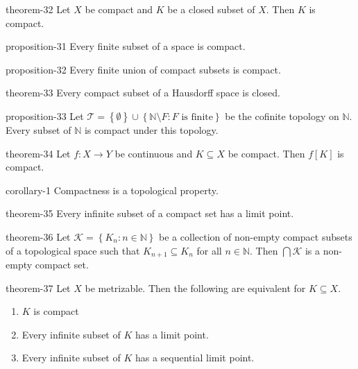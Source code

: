 \documentclass[10pt,]{article}
\newcommand{\mb}{\mathbb}
\newcommand{\mc}{\mathcal}
\newcommand{\setBuilder}[2]{\left\{#1:#2\right\}}
\newcommand{\setList}[1]{\left\{#1\right\}}
\begin{document}
\begin{theorem}{}{}{theorem-32}%
\hypertarget{p-144}{}%
Let \(X\) be compact and \(K\) be a closed subset of \(X\). Then \(K\) is compact.%
\end{theorem}
\begin{proposition}{}{}{proposition-31}%
\hypertarget{p-145}{}%
Every finite subset of a space is compact.%
\end{proposition}
\begin{proposition}{}{}{proposition-32}%
\hypertarget{p-146}{}%
Every finite union of compact subsets is compact.%
\end{proposition}
\begin{theorem}{}{}{theorem-33}%
\hypertarget{p-147}{}%
Every compact subset of a Hausdorff space is closed.%
\end{theorem}
\begin{proposition}{}{}{proposition-33}%
\hypertarget{p-148}{}%
Let \(\mc T=\setList{\emptyset}\cup
\setBuilder{\mb N\setminus F}{F\text{ is finite}}\) be the cofinite topology on \(\mb N\). Every subset of \(\mb N\) is compact under this topology.%
\end{proposition}
\begin{theorem}{}{}{theorem-34}%
\hypertarget{p-149}{}%
Let \(f:X\to Y\) be continuous and \(K\subseteq X\) be compact. Then \(f[K]\) is compact.%
\end{theorem}
\begin{corollary}{}{}{corollary-1}%
\hypertarget{p-150}{}%
Compactness is a topological property.%
\end{corollary}
\begin{theorem}{}{}{theorem-35}%
\hypertarget{p-151}{}%
Every infinite subset of a compact set has a limit point.%
\end{theorem}
\begin{theorem}{}{}{theorem-36}%
\hypertarget{p-152}{}%
Let \(\mc K=\setBuilder{K_n}{n\in\mb N}\) be a collection of non-empty compact subsets of a topological space such that \(K_{n+1}\subseteq K_n\) for all \(n\in\mb N\). Then \(\bigcap\mc K\) is a non-empty compact set.%
\end{theorem}
\begin{theorem}{}{}{theorem-37}%
\hypertarget{p-153}{}%
Let \(X\) be metrizable. Then the following are equivalent for \(K\subseteq X\).%
\leavevmode%
\begin{enumerate}
\item\hypertarget{li-110}{}\(K\) is compact%
\item\hypertarget{li-111}{}Every infinite subset of \(K\) has a limit point.%
\item\hypertarget{li-112}{}Every infinite subset of \(K\) has a sequential limit point.%
\end{enumerate}
\end{theorem}
\end{document}
